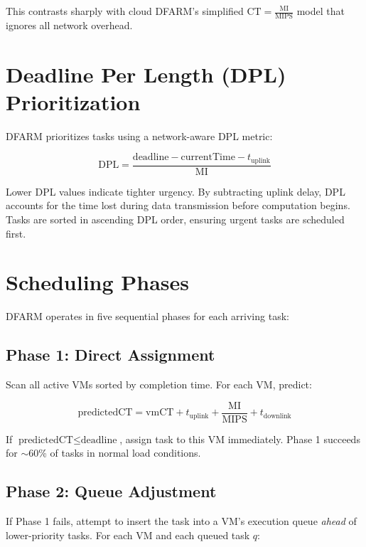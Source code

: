 \documentclass[12pt]{report}
\begin{document}
This contrasts sharply with cloud DFARM's simplified $\text{CT} = \frac{\text{MI}}{\text{MIPS}}$ model that ignores all network overhead.

\section{Deadline Per Length (DPL) Prioritization}

DFARM prioritizes tasks using a network-aware DPL metric:

\begin{equation}
\text{DPL} = \frac{\text{deadline} - \text{currentTime} - t_{\text{uplink}}}{\text{MI}}
\label{eq:dpl_formula}
\end{equation}

Lower DPL values indicate tighter urgency. By subtracting uplink delay, DPL accounts for the time lost during data transmission before computation begins. Tasks are sorted in ascending DPL order, ensuring urgent tasks are scheduled first.

\section{Scheduling Phases}

DFARM operates in five sequential phases for each arriving task:

\subsection{Phase 1: Direct Assignment}

Scan all active VMs sorted by completion time. For each VM, predict:

\begin{equation}
\text{predictedCT} = \text{vmCT} + t_{\text{uplink}} + \frac{\text{MI}}{\text{MIPS}} + t_{\text{downlink}}
\end{equation}

If $\text{predictedCT} \leq \text{deadline}$, assign task to this VM immediately. Phase 1 succeeds for $\sim$60\% of tasks in normal load conditions.

\subsection{Phase 2: Queue Adjustment}

If Phase 1 fails, attempt to insert the task into a VM's execution queue \textit{ahead} of lower-priority tasks. For each VM and each queued task $q$:
\end{document}
